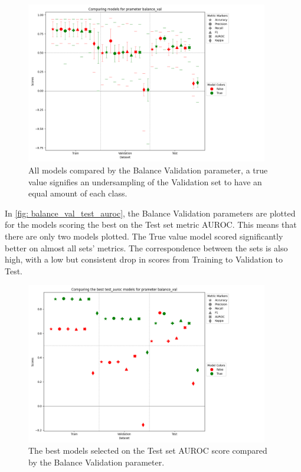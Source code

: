 \begin{figure}[H]
    \centering
    \includegraphics[width=400px]{Figures/results/balance_val/balance_val.png}
    \caption{All models compared by the Balance Validation parameter, a true value signifies an undersampling of the Validation set to have an equal amount of each class.}
    \label{fig: balance_val}
\end{figure}

In \autoref{fig: balance_val_test_auroc}, the Balance Validation parameters are plotted for the models scoring the best on the Test set metric AUROC. This means that there are only two models plotted. The True value model scored significantly better on almost all sets' metrics. The correspondence between the sets is also high, with a low but consistent drop in scores from Training to Validation to Test.


\begin{figure}[H]
    \centering
    \includegraphics[width=400px]{Figures/results/balance_val/balance_val_test_auroc.png}
    \caption{The best models selected on the Test set AUROC score compared by the Balance Validation parameter.}
    \label{fig: balance_val_test_auroc}
\end{figure}

